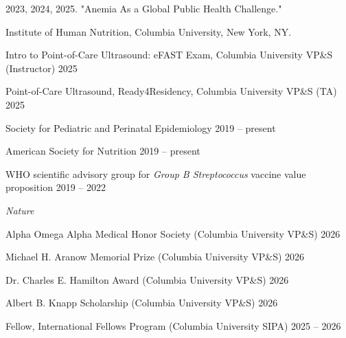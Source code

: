 \documentclass[11pt,article,oneside]{memoir}
\begin{document}
\bigskip

\medskip

 2023, 2024, 2025. "Anemia As a Global Public Health Challenge."

\indent \indent Institute of Human Nutrition, Columbia University, New York, NY.

\bigskip 

\medskip

\ind Intro to Point-of-Care Ultrasound: eFAST Exam, Columbia University VP\&S (Instructor) \hfill 2025 

\ind Point-of-Care Ultrasound, Ready4Residency, Columbia University VP\&S (TA) \hfill 2025

\bigskip

\medskip

\ind Society for Pediatric and Perinatal Epidemiology \hfill 2019 -- present

\ind American Society for Nutrition \hfill 2019 -- present

\ind WHO scientific advisory group for \emph{Group B Streptococcus} vaccine value proposition \hfill 2019 -- 2022

\bigskip

\medskip

\ind \emph{Nature}

\bigskip


\medskip

\ind Alpha Omega Alpha Medical Honor Society (Columbia University VP\&S) \hfill 2026

\ind Michael H. Aranow Memorial Prize (Columbia University VP\&S) \hfill 2026

\ind Dr. Charles E. Hamilton Award (Columbia University VP\&S) \hfill 2026

\ind Albert B. Knapp Scholarship (Columbia University VP\&S) \hfill 2026

\ind Fellow, International Fellows Program (Columbia University SIPA) \hfill 2025 -- 2026
\end{document}
